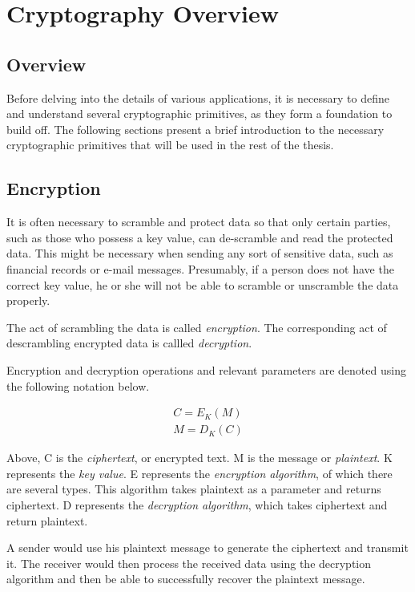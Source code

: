 \chapter{Cryptography Overview}
\label{chapter:cryptographyoverview}

\section{Overview}
Before delving into the details of various applications, it is necessary to define and understand several
cryptographic primitives, as they form a foundation to build off. The following sections present a brief
introduction to the necessary cryptographic primitives that will be used in the rest of the thesis.

\section{Encryption}
It is often necessary to scramble and protect data so that only certain parties, such as those who
possess a key value, can de-scramble and read the protected data. This might be necessary when
sending any sort of sensitive data, such as financial records or e-mail messages. Presumably, if a 
person does not have the correct key value, he or she will not be able to scramble or unscramble
the data properly.

The act of scrambling the data is called \emph{encryption}. The corresponding act of descrambling
encrypted data is callled \emph{decryption}.

Encryption and decryption operations and relevant parameters are denoted using the following notation below.

\begin{align}
C  = E_K(M) \\
M = D_K(C)
\end{align}

Above, C is the \emph{ciphertext}, or encrypted text.  
M is the message or \emph{plaintext}. 
K represents the \emph{key value}. 
E represents the \emph{encryption algorithm}, of which there are several types. This algorithm takes plaintext as a parameter and returns ciphertext.
D represents the \emph{decryption algorithm}, which takes ciphertext and return plaintext.

A sender would use his plaintext message to generate the ciphertext and transmit it. The receiver would then process the received data using the decryption
algorithm and then be able to successfully recover the plaintext message.

